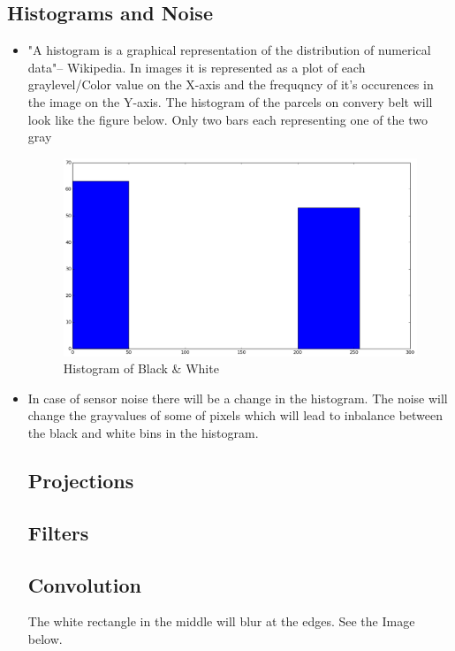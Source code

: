 \documentclass[paper=a4, fontsize=11pt]{scrartcl} %
\numberwithin{equation}{section} %
\numberwithin{figure}{section} %
\numberwithin{table}{section} %
\begin{document}
\subsection{Histograms and Noise}
\begin{itemize}
\item "A histogram is a graphical representation of the distribution of numerical data"-- Wikipedia. 
In images it is represented as a plot of each graylevel/Color value on the X-axis and the frequqncy of it's occurences in the image on 
the Y-axis. The histogram of the parcels on convery belt will look like the figure below. Only two bars each representing one of the two gray

\begin{figure}[hbtp]
\centering
\includegraphics[scale=.2]{figure_1.png}
\caption{Histogram of Black \& White}
\end{figure}
 
\item In case of sensor noise there will be a change in the histogram. The noise will change the grayvalues of some of pixels which 
will lead to inbalance between the black and white bins in the histogram.
\subsection{Projections}
\subsection{Filters}
\subsection{Convolution}
The white rectangle in the middle will blur at the edges. See the Image below.


\end{itemize}
\end{document}
